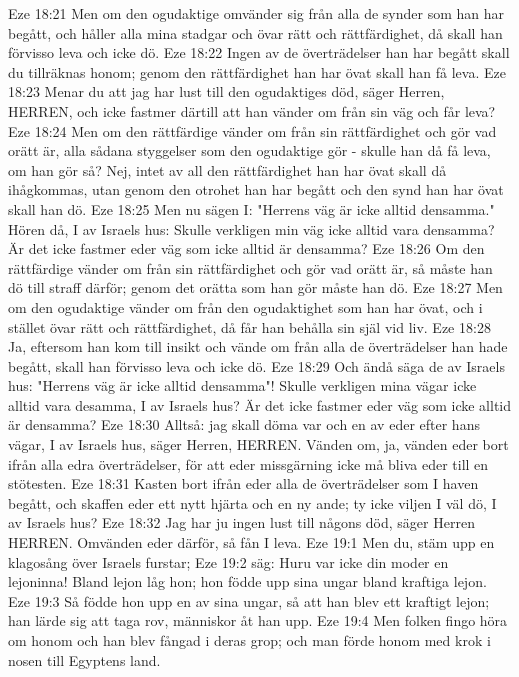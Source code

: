Eze 18:21  Men om den ogudaktige omvänder sig från alla de synder som han har begått, och håller alla mina stadgar och övar rätt och rättfärdighet, då skall han förvisso leva och icke dö.
Eze 18:22  Ingen av de överträdelser han har begått skall du tillräknas honom; genom den rättfärdighet han har övat skall han få leva.
Eze 18:23  Menar du att jag har lust till den ogudaktiges död, säger Herren, HERREN, och icke fastmer därtill att han vänder om från sin väg och får leva?
Eze 18:24  Men om den rättfärdige vänder om från sin rättfärdighet och gör vad orätt är, alla sådana styggelser som den ogudaktige gör - skulle han då få leva, om han gör så? Nej, intet av all den rättfärdighet han har övat skall då ihågkommas, utan genom den otrohet han har begått och den synd han har övat skall han dö.
Eze 18:25  Men nu sägen I: "Herrens väg är icke alltid densamma." Hören då, I av Israels hus: Skulle verkligen min väg icke alltid vara densamma? Är det icke fastmer eder väg som icke alltid är densamma?
Eze 18:26  Om den rättfärdige vänder om från sin rättfärdighet och gör vad orätt är, så måste han dö till straff därför; genom det orätta som han gör måste han dö.
Eze 18:27  Men om den ogudaktige vänder om från den ogudaktighet som han har övat, och i stället övar rätt och rättfärdighet, då får han behålla sin själ vid liv.
Eze 18:28  Ja, eftersom han kom till insikt och vände om från alla de överträdelser han hade begått, skall han förvisso leva och icke dö.
Eze 18:29  Och ändå säga de av Israels hus: "Herrens väg är icke alltid densamma"! Skulle verkligen mina vägar icke alltid vara desamma, I av Israels hus? Är det icke fastmer eder väg som icke alltid är densamma?
Eze 18:30  Alltså: jag skall döma var och en av eder efter hans vägar, I av Israels hus, säger Herren, HERREN. Vänden om, ja, vänden eder bort ifrån alla edra överträdelser, för att eder missgärning icke må bliva eder till en stötesten.
Eze 18:31  Kasten bort ifrån eder alla de överträdelser som I haven begått, och skaffen eder ett nytt hjärta och en ny ande; ty icke viljen I väl dö, I av Israels hus?
Eze 18:32  Jag har ju ingen lust till någons död, säger Herren HERREN. Omvänden eder därför, så fån I leva.
Eze 19:1  Men du, stäm upp en klagosång över Israels furstar;
Eze 19:2  säg: Huru var icke din moder en lejoninna! Bland lejon låg hon; hon födde upp sina ungar bland kraftiga lejon.
Eze 19:3  Så födde hon upp en av sina ungar, så att han blev ett kraftigt lejon; han lärde sig att taga rov, människor åt han upp.
Eze 19:4  Men folken fingo höra om honom och han blev fångad i deras grop; och man förde honom med krok i nosen till Egyptens land.
